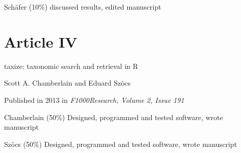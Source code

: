 \begin{sloppypar}
\begin{description}
	Schäfer (10\%) discussed results, edited manuscript
\end{description}
\normalsize


\section*{Article IV}
\small
\begin{description}
    \setlength\itemsep{0.3em}
	\item[Title:] taxize: taxonomic search and retrieval in R
	\item[Authors:] Scott A. Chamberlain and Eduard Szöcs
	\item[Status:] Published in 2013 in \emph{F1000Research, Volume 2, Issue 191}
	\item[Contributions:] Chamberlain (50\%) Designed, programmed and tested software, wrote manuscript

	Szöcs (50\%) Designed, programmed and tested software, wrote manuscript
\end{description}
\end{sloppypar}
